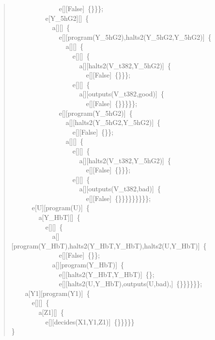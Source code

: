 \begin{quote}
{~~~~~~~~~~~~~~e[][False]~\{\}\}\};\\
~~~~~~~~~~e[Y\_5hG2][]~\{\\
~~~~~~~~~~~~a[][]~\{\\
~~~~~~~~~~~~~~e[][program(Y\_5hG2),halts2(Y\_5hG2,Y\_5hG2)]~\{\\
~~~~~~~~~~~~~~~~a[][]~\{\\
~~~~~~~~~~~~~~~~~~e[][]~\{\\
~~~~~~~~~~~~~~~~~~~~a[][halts2(V\_t382,Y\_5hG2)]~\{\\
~~~~~~~~~~~~~~~~~~~~~~e[][False]~\{\}\}\};\\
~~~~~~~~~~~~~~~~~~e[][]~\{\\
~~~~~~~~~~~~~~~~~~~~a[][outputs(V\_t382,good)]~\{\\
~~~~~~~~~~~~~~~~~~~~~~e[][False]~\{\}\}\}\}\};\\
~~~~~~~~~~~~~~e[][program(Y\_5hG2)]~\{\\
~~~~~~~~~~~~~~~~a[][halts2(Y\_5hG2,Y\_5hG2)]~\{\\
~~~~~~~~~~~~~~~~~~e[][False]~\{\}\};\\
~~~~~~~~~~~~~~~~a[][]~\{\\
~~~~~~~~~~~~~~~~~~e[][]~\{\\
~~~~~~~~~~~~~~~~~~~~a[][halts2(V\_t382,Y\_5hG2)]~\{\\
~~~~~~~~~~~~~~~~~~~~~~e[][False]~\{\}\}\};\\
~~~~~~~~~~~~~~~~~~e[][]~\{\\
~~~~~~~~~~~~~~~~~~~~a[][outputs(V\_t382,bad)]~\{\\
~~~~~~~~~~~~~~~~~~~~~~e[][False]~\{\}\}\}\}\}\}\}\}\};\\
~~~~~~e[U][program(U)]~\{\\
~~~~~~~~a[Y\_HbT][]~\{\\
~~~~~~~~~~e[][]~\{\\
~~~~~~~~~~~~a[][program(Y\_HbT),halts2(Y\_HbT,Y\_HbT),halts2(U,Y\_HbT)]~\{\\
~~~~~~~~~~~~~~e[][False]~\{\}\};\\
~~~~~~~~~~~~a[][program(Y\_HbT)]~\{\\
~~~~~~~~~~~~~~e[][halts2(Y\_HbT,Y\_HbT)]~\{\};\\
~~~~~~~~~~~~~~e[][halts2(U,Y\_HbT),outputs(U,bad),]~\{\}\}\}\}\}\};\\
~~~~a[Y1][program(Y1)]~\{\\
~~~~~~e[][]~\{\\
~~~~~~~~a[Z1][]~\{\\
~~~~~~~~~~e[][decides(X1,Y1,Z1)]~\{\}\}\}\}\}\\
\}\\
}
\end{quote}



